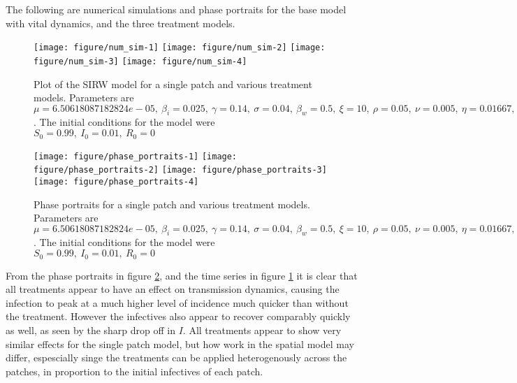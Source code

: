 \documentclass[12pt]{article}\usepackage[]{graphicx}\usepackage[]{color}
\newenvironment{knitrout}{}{} %
\begin{document}
The following are numerical simulations and phase portraits for the base model with vital dynamics, and the three treatment models.

\begin{knitrout}
\color{fgcolor}\begin{figure}

{\centering \texttt{[image: figure/num\_sim-1]} 
\texttt{[image: figure/num\_sim-2]} 
\texttt{[image: figure/num\_sim-3]} 
\texttt{[image: figure/num\_sim-4]} 

}

\caption{\label{fig:num.sim} Plot of the SIRW model for a single patch and various treatment models. Parameters are $\mu=6.50618087182824e-05,\ \beta_i=0.025,\ \gamma=0.14,\ \sigma=0.04,\ \beta_w=0.5,\ \xi=10,\ \rho=0.05,\ \nu=0.005,\ \eta=0.01667,\ \alpha=0$. The initial conditions for the model were $S_0=0.99,\ I_0=0.01,\ R_0=0$}\label{fig:num.sim}
\end{figure}


\end{knitrout}
\begin{knitrout}
\color{fgcolor}\begin{figure}

{\centering \texttt{[image: figure/phase\_portraits-1]} 
\texttt{[image: figure/phase\_portraits-2]} 
\texttt{[image: figure/phase\_portraits-3]} 
\texttt{[image: figure/phase\_portraits-4]} 

}

\caption{\label{fig:phase.portraits} Phase portraits for a single patch and various treatment models. Parameters are $\mu=6.50618087182824e-05,\ \beta_i=0.025,\ \gamma=0.14,\ \sigma=0.04,\ \beta_w=0.5,\ \xi=10,\ \rho=0.05,\ \nu=0.005,\ \eta=0.01667,\ \alpha=0$. The initial conditions for the model were $S_0=0.99,\ I_0=0.01,\ R_0=0$}\label{fig:phase.portraits}
\end{figure}


\end{knitrout}
\FloatBarrier
From the phase portraits in figure \ref{fig:phase.portraits}, and the time series in figure \ref{fig:num.sim} it is clear that all treatments appear to have an effect on transmission dynamics, causing the infection to peak at a much higher level of incidence much quicker than without the treatment.
However the infectives also appear to recover comparably quickly as well, as seen by the sharp drop off in $I$.
All treatments appear to show very similar effects for the single patch model, but how work in the spatial model may differ, espescially singe the treatments can be applied heterogenously across the patches, in proportion to the initial infectives of each patch.
\end{document}
